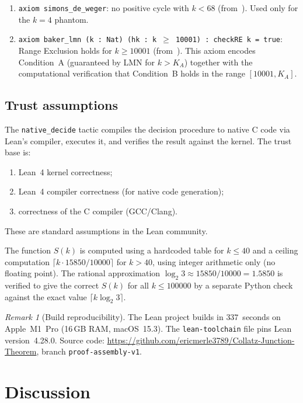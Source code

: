 \documentclass[11pt, a4paper]{amsart}
\theoremstyle{plain}
\theoremstyle{definition}
\theoremstyle{remark}
\newtheorem{remark}[theorem]{Remark}
\begin{document}
\begin{enumerate}
  \item \texttt{axiom simons\_de\_weger}: no positive cycle
    with $k < 68$ (from~\cite{SimonsDeWeger2005}).
    Used only for the $k = 4$ phantom.
  \item \texttt{axiom baker\_lmn (k : Nat) (hk : k $\geq$ 10001) :
    checkRE k = true}: Range Exclusion holds for $k \geq 10001$
    (from~\cite{LMN1995}).  This axiom encodes
    Condition~A (guaranteed by LMN for $k > K_A$) together
    with the computational verification that Condition~B holds
    in the range $[10001, K_A]$.
\end{enumerate}

\subsection{Trust assumptions}

The \texttt{native\_decide} tactic compiles the decision
procedure to native C code via Lean's compiler, executes it,
and verifies the result against the kernel.  The trust base is:
\begin{enumerate}
  \item Lean~4 kernel correctness;
  \item Lean~4 compiler correctness (for native code generation);
  \item correctness of the C compiler (GCC/Clang).
\end{enumerate}
These are standard assumptions in the Lean community.

The function $S(k)$ is computed using a hardcoded table
for $k \leq 40$ and a ceiling computation
$\lceil k \cdot 15850/10000 \rceil$ for $k > 40$, using
integer arithmetic only (no floating point).  The rational
approximation $\log_2 3 \approx 15850/10000 = 1.5850$ is
verified to give the correct $S(k)$ for all $k \leq 100000$
by a separate Python check against the exact value
$\lceil k \log_2 3 \rceil$.

\begin{remark}[Build reproducibility]\label{rem:build}
  The Lean project builds in $337$~seconds on Apple~M1~Pro
  (16\,GB RAM, macOS~15.3).  The \texttt{lean-toolchain} file
  pins Lean version~4.28.0.
  Source code: \url{https://github.com/ericmerle3789/Collatz-Junction-Theorem},
  branch \texttt{proof-assembly-v1}.
\end{remark}

\section{Discussion}\label{sec:discussion}
\end{document}

